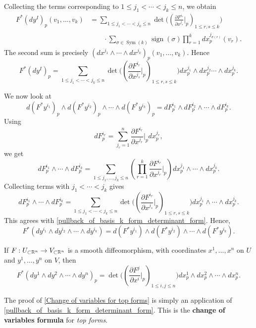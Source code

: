 Collecting the terms corresponding to $1\leq j_1<\cdots<j_k\leq n$, we obtain
\[
\begin{aligned}
F^*(dy^I)_p(v_1,\ldots,v_k)
&=\sum_{1\leq j_1<\cdots<j_k\leq n}\det\Bigg(\left(\frac{\partial F^{i_r}}{\partial x^{j_s}}\Big|_p\right)_{1\leq r,s\leq k}\Bigg)\\
&\qquad\cdot\sum_{\sigma\in\operatorname{Sym}(k)}\operatorname{sign}(\sigma)\prod_{r=1}^kdx^{j_{\sigma(r)}}_p(v_r).
\end{aligned}
\]
The second sum is precisely $(dx^{j_1}\wedge\cdots\wedge dx^{j_k})_p(v_1,\ldots,v_k)$. Hence
\begin{equation}\label{pullback_of_basis_k_form_determinant_form}
F^*(dy^I)_p=\sum_{1\leq j_1<\cdots<j_k\leq n}\det\Bigg(\left(\frac{\partial F^{i_r}}{\partial x^{j_s}}\Big|_p\right)_{1\leq r,s\leq k}\Bigg)dx^{j_1}_p\wedge dx^{j_2}_p\cdots\wedge dx^{j_k}_p.
\end{equation}

We now look at
\[
d(F^*y^{i_1})_p\wedge d(F^*y^{i_2})_p\wedge\cdots\wedge d(F^*y^{i_k})_p=dF^{i_1}_p\wedge dF^{i_2}_p\wedge\cdots\wedge dF^{i_k}_p.
\]
Using
\[
dF^{i_r}_p=\sum_{j_r=1}^n\frac{\partial F^{i_r}}{\partial x^{j_r}}\Big|_pdx^{j_r}_p,
\]
we get
\[
dF^{i_1}_p\wedge\cdots\wedge dF^{i_k}_p=\sum_{1\leq j_1,\ldots,j_k\leq n}\left(\prod_{r=1}^k\frac{\partial F^{i_r}}{\partial x^{j_r}}\Big|_p\right)dx^{j_1}_p\wedge\cdots\wedge dx^{j_k}_p.
\]
Collecting terms with $j_1<\cdots<j_k$ gives
\[
dF^{i_1}_p\wedge\cdots\wedge dF^{i_k}_p=\sum_{1\leq j_1<\cdots<j_k\leq n}\det\Bigg(\left(\frac{\partial F^{i_r}}{\partial x^{j_s}}\Big|_p\right)_{1\leq r,s\leq k}\Bigg)dx^{j_1}_p\wedge\cdots\wedge dx^{j_k}_p.
\]
This agrees with \ref{pullback_of_basis_k_form_determinant_form}. Hence,
\begin{equation}
F^*(dy^{i_1}\wedge dy^{i_2}\wedge\cdots\wedge dy^{i_k})=d(F^*y^{i_1})\wedge d(F^*y^{i_2})\wedge\cdots\wedge d(F^*y^{i_k}).
\end{equation}

\begin{corollary}\label{Change of variables for top forms}
If $F:U_{\subset\mathbb{R}^n}\to V_{\subset\mathbb{R}^n}$ is a smooth diffeomorphism, with coordinates $x^1,\ldots,x^n$ on $U$ and $y^1,\ldots,y^n$ on $V$, then
\[
F^*(dy^1\wedge dy^2\wedge\cdots\wedge dy^n)_p=\det\Bigg(\left(\frac{\partial F^j}{\partial x^i}\Big|_p\right)_{1\leq i,j\leq n}\Bigg)dx^1_p\wedge dx^2_p\wedge\cdots\wedge dx^n_p.
\]
\end{corollary}

\begin{remark}
The proof of \ref{Change of variables for top forms} is simply an application of \ref{pullback_of_basis_k_form_determinant_form}. This is the \textbf{change of variables formula} for \emph{top forms}.
\end{remark}

